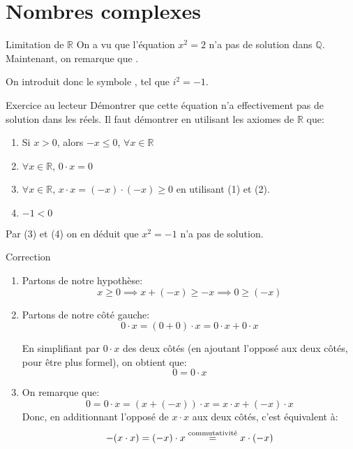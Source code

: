 \documentclass{article}
\begin{document}
\section{Nombres complexes}
\begin{parag}{Limitation de $\mathbb{R}$}
    On a vu que l'équation $x^2 = 2$ n'a pas de solution dans $\mathbb{Q}$. Maintenant, on remarque que .

    On introduit donc le symbole , tel que $i^2 = -1$.

    \begin{subparag}{Exercice au lecteur}
        Démontrer que cette équation n'a effectivement pas de solution dans les réels. Il faut démontrer en utilisant les axiomes de $\mathbb{R}$ que:
        \begin{enumerate}
            \item Si $x > 0$, alors $-x\leq 0$, $\forall x \in \mathbb{R}$
            \item $\forall x \in \mathbb{R}$, $0\cdot x = 0$
            \item $\forall x \in \mathbb{R}$, $x\cdot x = \left(-x\right)\cdot\left(-x\right) \geq 0$ en utilisant (1) et (2).
            \item $-1 < 0$
        \end{enumerate}

        Par (3) et (4) on en déduit que $x^2 = -1$ n'a pas de solution.
    \end{subparag}

    \begin{subparag}{Correction}
        \begin{enumerate}[left=0pt]
            \item Partons de notre hypothèse:
                \[x \geq 0 \implies x + \left(-x\right) \geq -x \implies 0 \geq \left(-x\right)\]
            \item Partons de notre côté gauche:
                \[0\cdot x = \left(0 + 0\right)\cdot x = 0\cdot x + 0\cdot x\]

            En simplifiant par $0\cdot x$ des deux côtés (en ajoutant l'opposé aux deux côtés, pour être plus formel), on obtient que:
             \[0 = 0\cdot x\]
         \item On remarque que:
             \[0 = 0\cdot x = \left(x + \left(-x\right)\right)\cdot x = x\cdot x + \left(-x\right)\cdot x\]
          Donc, en additionnant l'opposé de $x\cdot x$ aux deux côtés, c'est équivalent à:
          \[-\left(x\cdot x\right) = \left(-x\right)\cdot x \over{=}{\text{commutativité}} x\cdot\left(-x\right)\]


\end{enumerate}
\end{subparag}
\end{parag}
\end{document}
